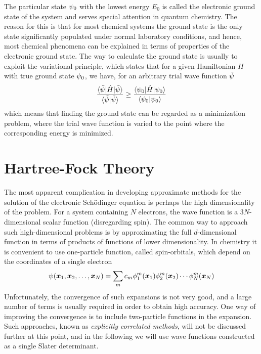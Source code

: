 The particular state $\psi_0$ with the lowest energy $E_0$ is called 
the electronic ground state of the system and serves special attention in quantum chemistry.
The reason for this is that for most chemical systems the ground state is the only state
significantly populated under normal laboratory conditions, and hence, most chemical 
phenomena can be explained in terms of properties of the electronic ground state. The way to
calculate the ground state is usually to exploit the variational principle, which states that
for a given Hamiltonian $H$ with true ground state $\psi_0$, we have, for an arbitrary
trial wave function $\tilde{\psi}$
\begin{equation}
    \label{eq:var_princ}
    \frac{\langle\tilde{\psi}|\hat{H}|\tilde{\psi}\rangle}
    {\langle\tilde{\psi}|\tilde{\psi}\rangle}
    \geq
    \frac{\langle\psi_0|\hat{H}|\psi_0\rangle}
    {\langle\psi_0|\psi_0\rangle}
\end{equation}
which means that finding the ground state can be regarded as a minimization problem, where
the trial wave function is varied to the point where the corresponding energy is minimized.

\section{Hartree-Fock Theory}\label{sec:HFT}
The most apparent complication in developing approximate methods for the solution of the 
electronic Sch\"{o}dinger equation is perhaps the high dimensionality of the problem. For
a system containing $N$ electrons, the wave function is a $3N$-dimensional scalar function 
(disregarding spin). The common way to approach such high-dimensional problems is by
approximating the full $d$-dimensional function in terms of products of functions of lower 
dimensionality. In chemistry it is convenient to use one-particle function, called spin-orbitals,
which depend on the coordinates of a single electron
\begin{equation}
    \label{eq:orb_exp}
    \psi(\boldsymbol x_1,\boldsymbol x_2,\dots,\boldsymbol x_N) = \sum_m c_m 
	\phi_1^m(\boldsymbol x_1)
	\phi_2^m(\boldsymbol x_2)\cdots
	\phi_N^m(\boldsymbol x_N)
\end{equation}
Unfortunately, the convergence of such expansions is not very good, and a large number
of terms is usually required in order to obtain high accuracy. One way of improving
the convergence is to include two-particle functions in the expansion. Such approaches,
known as \emph{explicitly correlated methods}\cite{klopper,valeev}, will not be discussed
further at this point, and in the following we will use wave functions constructed as a 
single Slater determinant.

